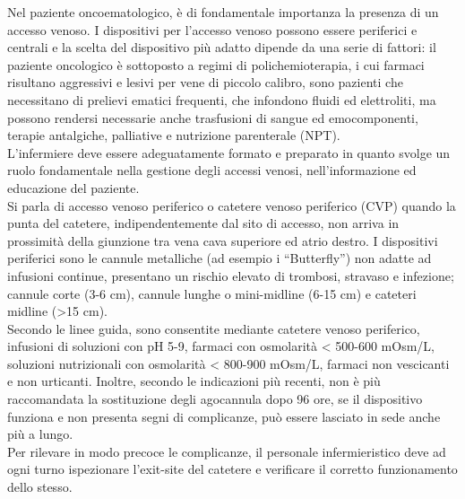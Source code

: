 Nel paziente oncoematologico, è di fondamentale importanza la presenza di un accesso venoso. I dispositivi per 
l’accesso venoso possono essere periferici e centrali e la scelta del dispositivo più adatto dipende da una serie di 
fattori: il paziente oncologico è sottoposto a regimi di polichemioterapia, i cui farmaci risultano aggressivi e 
lesivi per vene di piccolo calibro, sono pazienti che necessitano di prelievi ematici frequenti, che infondono fluidi 
ed elettroliti, ma possono rendersi necessarie anche trasfusioni di sangue ed emocomponenti, terapie antalgiche, 
palliative e nutrizione parenterale (NPT).\\
L’infermiere deve essere adeguatamente formato e preparato in quanto svolge un ruolo fondamentale nella gestione 
degli accessi venosi, nell’informazione ed educazione del paziente.\\
Si parla di accesso venoso periferico o catetere venoso periferico (CVP) quando la punta del catetere, 
indipendentemente dal sito di accesso, non arriva in prossimità della giunzione tra vena cava superiore ed atrio destro. 
I dispositivi periferici sono le cannule metalliche (ad esempio i “Butterfly”) non adatte ad infusioni continue, 
presentano un rischio elevato di trombosi, stravaso e infezione; cannule corte (3-6 cm), cannule lunghe o 
mini-midline (6-15 cm) e cateteri midline (>15 cm)\cite{GAVECELTCVC}.\\
Secondo le linee guida, sono consentite mediante catetere venoso periferico, infusioni di soluzioni con pH 5-9, 
farmaci con osmolarità < 500-600 mOsm/L, soluzioni nutrizionali con osmolarità < 800-900 mOsm/L, farmaci non 
vescicanti e non urticanti. Inoltre, secondo le indicazioni più recenti, non è più raccomandata la sostituzione 
degli agocannula dopo 96 ore, se il dispositivo funziona e non presenta segni di complicanze, 
può essere lasciato in sede anche più a lungo\cite{GAVECELTCVC}.\\
Per rilevare in modo precoce le complicanze, il personale infermieristico deve ad ogni turno ispezionare 
l’exit-site del catetere e verificare il corretto funzionamento dello stesso\cite{GAVECELTracc2021}.\\

